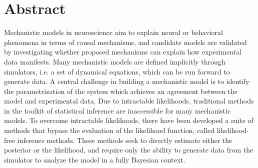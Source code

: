 \chapter*{Abstract}
\thispagestyle{plain}



Mechanistic models in neuroscience aim to explain neural or behavioral phenomena in terms of causal mechanisms, and candidate models are validated by investigating whether proposed mechanisms can explain how experimental data manifests. Many mechanistic models are defined implicitly through simulators, i.e. a set of dynamical equations, which can be run forward to generate data. A central challenge in building a mechanistic model is to identify the parametrization of the system which achieves an agreement between the model and experimental data. Due to intractable likelihoods, traditional methods in the toolkit of statistical inference are inaccessible for many mechanistic models. To overcome intractable likelihoods, there have been developed a suite of methods that bypass the evaluation of the likelihood function, called likelihood-free inference methods. These methods seek to directly estimate either the posterior or the likelihood, and require only the ability to generate data from the simulator to analyze the model in a fully Bayesian context.





